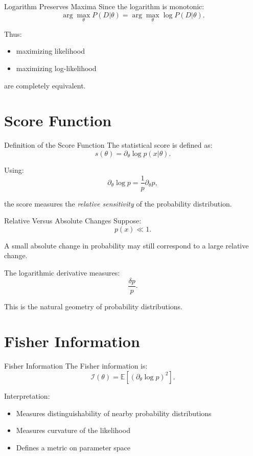\documentclass{beamer}
\begin{document}
\begin{frame}{Logarithm Preserves Maxima}
Since the logarithm is monotonic:
\[
\arg\max_\theta P(D|\theta)
=
\arg\max_\theta \log P(D|\theta).
\]

\pause

Thus:
\begin{itemize}
\item maximizing likelihood
\item maximizing log-likelihood
\end{itemize}

are completely equivalent.
\end{frame}

\section{Score Function}

\begin{frame}{Definition of the Score Function}
The statistical score is defined as:
\[
s(\theta)
=
\partial_\theta \log p(x|\theta).
\]

\pause

Using:
\[
\partial_\theta \log p
=
\frac{1}{p}\partial_\theta p,
\]

the score measures the \emph{relative sensitivity} of the probability distribution.
\end{frame}

\begin{frame}{Relative Versus Absolute Changes}
Suppose:
\[
p(x) \ll 1.
\]

A small absolute change in probability may still correspond to a large relative change.

\pause

The logarithmic derivative measures:
\[
\frac{\delta p}{p}.
\]

\pause

This is the natural geometry of probability distributions.
\end{frame}

\section{Fisher Information}

\begin{frame}{Fisher Information}
The Fisher information is:
\[
\mathcal I(\theta)
=
\mathbb E
\left[
(\partial_\theta \log p)^2
\right].
\]

\pause

Interpretation:
\begin{itemize}
\item Measures distinguishability of nearby probability distributions
\item Measures curvature of the likelihood
\item Defines a metric on parameter space
\end{itemize}
\end{frame}
\end{document}
